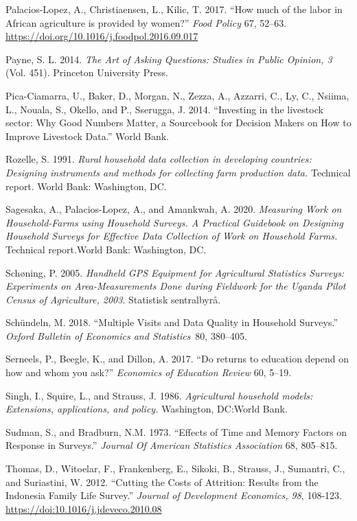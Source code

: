 \documentclass[
]{book}
\begin{document}
Palacios-Lopez, A., Christiaensen, L., Kilic, T. 2017. ``How much of the labor in African agriculture is provided by women?'' \emph{Food Policy} 67, 52--63. \url{https://doi.org/10.1016/j.foodpol.2016.09.017}

Payne, S. L. 2014. \emph{The Art of Asking Questions: Studies in Public Opinion, 3} (Vol. 451). Princeton University Press.

Pica-Ciamarra, U., Baker, D., Morgan, N., Zezza, A., Azzarri, C., Ly, C., Nsiima, L., Nouala, S., Okello, and P., Sserugga, J. 2014. ``Investing in the livestock sector: Why Good Numbers Matter, a Sourcebook for Decision Makers on How to Improve Livestock Data.'' World Bank.

Rozelle, S. 1991. \emph{Rural household data collection in developing countries: Designing instruments and methods for collecting farm production data.} Technical report. World Bank: Washington, DC.

Sagesaka, A., Palacios-Lopez, A., and Amankwah, A. 2020. \emph{Measuring Work on Household-Farms using Household Surveys. A Practical Guidebook on Designing Household Surveys for Effective Data Collection of Work on Household Farms.} Technical report.World Bank: Washington, DC.

Schøning, P. 2005. \emph{Handheld GPS Equipment for Agricultural Statistics Surveys: Experiments on Area-Measurements Done during Fieldwork for the Uganda Pilot Census of Agriculture, 2003}. Statistisk sentralbyrå.

Schündeln, M. 2018. ``Multiple Visits and Data Quality in Household Surveys.'' \emph{Oxford Bulletin of Economics and Statistics}~80, 380--405.

Serneels, P., Beegle, K., and Dillon, A. 2017. ``Do returns to education depend on how and whom you ask?'' \emph{Economics of Education Review} 60, 5--19.

Singh, I., Squire, L., and Strauss, J. 1986. \emph{Agricultural household models: Extensions, applications, and policy.} Washington, DC:World Bank.

Sudman, S., and Bradburn, N.M. 1973. ``Effects of Time and Memory Factors on Response in Surveys.'' \emph{Journal Of American Statistics Association} 68, 805--815.

Thomas, D., Witoelar, F., Frankenberg, E., Sikoki, B., Strauss, J., Sumantri, C., and Suriastini, W. 2012. ``Cutting the Costs of Attrition: Results from the Indonesia Family Life Survey.'' \emph{Journal of Development Economics, 98}, 108-123. \url{https://doi:10.1016/j.jdeveco.2010.08}
\end{document}

